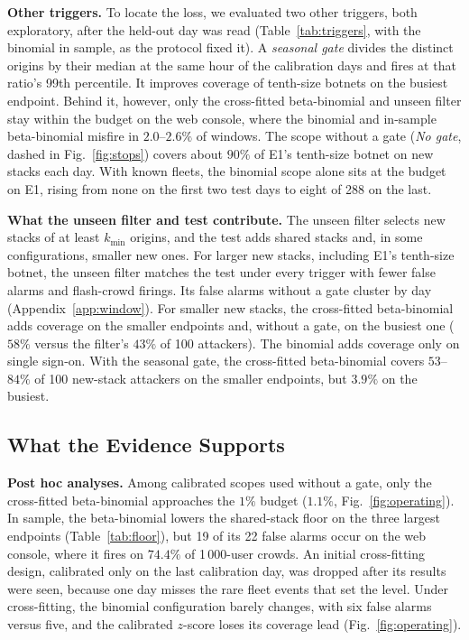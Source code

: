 \documentclass[conference,letterpaper,10pt]{IEEEtran}
\newcommand\1{\textit{(i)}}
\newcommand\2{\textit{(ii)}}
\newcommand\3{\textit{(iii)}}
\newcommand\4{\textit{(iv)}}
\newcommand\5{\textit{(v)}}
\newcommand\6{\textit{(vi)}}
\newcommand\7{\textit{(vii)}}
\newcommand\8{\textit{(viii)}}
\newcommand\9{\textit{(ix)}}
\begin{document}
\textbf{Other triggers.}
To locate the loss, we evaluated two other triggers, both
exploratory, after the held-out day was read
(Table~\ref{tab:triggers}, with the binomial in sample, as
the protocol fixed it). A \textit{seasonal gate} divides the
distinct origins by their median at the same hour of the
calibration days and fires at that ratio's 99th percentile.
It improves coverage of tenth-size
botnets on the busiest endpoint.
Behind it, however, only the cross-fitted beta-binomial and
unseen filter stay within the budget on the web console,
where the binomial and in-sample beta-binomial misfire in
$2.0$--$2.6\%$ of windows.
The scope without a gate (\textit{No gate}, dashed in
Fig.~\ref{fig:stops}) covers about $90\%$ of E1's tenth-size
botnet on new stacks each day.
With known fleets, the binomial scope alone sits at the
budget on E1, rising from none on the first two test days to
eight of 288 on the last.

\textbf{What the unseen filter and test contribute.}
The unseen filter selects new stacks of at least $k_{\min}$
origins, and the test adds shared stacks
and, in some configurations, smaller new
ones. For larger new stacks, including
E1's tenth-size botnet, the unseen filter
matches the test under every trigger
with fewer false alarms and flash-crowd firings. Its false alarms
without a gate cluster by day
(Appendix~\ref{app:window}).
For smaller new stacks, the cross-fitted
beta-binomial adds coverage on the smaller
endpoints and, without a gate, on the busiest one ($58\%$
versus the filter's $43\%$ of 100 attackers). The binomial
adds coverage only on single sign-on.
With the seasonal gate, the cross-fitted
beta-binomial covers $53$--$84\%$
of 100 new-stack attackers on the smaller endpoints, but
$3.9\%$ on the busiest.

\subsection{What the Evidence Supports}
\label{sec:posthoc}
\label{sec:boundary}

\textbf{Post hoc analyses.}
Among calibrated scopes used without a gate, only the cross-fitted
beta-binomial approaches the $1\%$
budget ($1.1\%$, Fig.~\ref{fig:operating}).
In sample, the beta-binomial lowers
the shared-stack floor on the three
largest endpoints (Table~\ref{tab:floor}),
but 19 of its 22 false alarms occur
on the web console, where it fires on $74.4\%$ of 1\,000-user crowds.
An initial cross-fitting design,
calibrated only on the last calibration
day, was dropped after its results were seen, because one
day misses the rare fleet events that set the level.
Under cross-fitting, the binomial configuration barely
changes, with six false alarms versus five, and the
calibrated $z$-score loses its coverage lead
(Fig.~\ref{fig:operating}).
\end{document}
